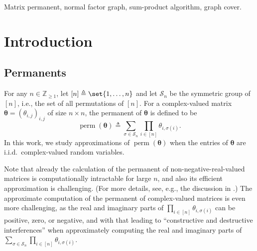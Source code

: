 \documentclass[conference]{IEEEtran}
\theoremstyle{plain}
\theoremstyle{definition}
\providecommand{\Z}{\mathbb {Z}}
\newcommand{\perm}{\operatorname{perm}}
\newcommand{\btheta}{\boldsymbol{\theta}}
\newcommand{\defeq}{\triangleq}
\begin{document}

\begin{IEEEkeywords}
 Matrix permanent, normal factor graph, sum-product algorithm, graph cover.
\end{IEEEkeywords}


\section{Introduction}



\subsection{Permanents}


For any $n\in\Z_{\geq1}$, let $[n] \defeq \set{1, \dots, n}$ and let
$\mathcal{S}_n$ be the symmetric group of $[n]$, i.e., the set of all
permutations of $[n]$. For a complex-valued matrix
$\btheta=(\theta_{i,j})_{i,j}$ of size $n \times n$, the permanent of $\btheta$
is defined to be
\[\perm(\btheta) \defeq \sum_{\sigma\in \mathcal{S}_n}\prod_{i\in[n]}
 \theta_{i,\sigma(i)}.\] In this work, we study approximations of $\perm (\btheta)$ when the entries
   of $\btheta$ are i.i.d.~complex-valued random variables.


Note that already the calculation of the permanent of non-negative-real-valued
matrices is computationally intractable for large $n$, and also its efficient
approximation is challenging. (For more details, see, e.g., the discussion in
\cite{vontobelBethePermanentNonnegative2013}.) The approximate computation of
the permanent of complex-valued matrices is even more challenging, as the real
and imaginary parts of $\prod_{i\in[n]} \theta_{i,\sigma(i)}$ can be positive,
zero, or negative, and with that leading to ``constructive and destructive
interferences'' when approximately computing the real and imaginary parts of
$\sum_{\sigma\in \mathcal{S}_n}\prod_{i\in[n]} \theta_{i,\sigma(i)}$.
\end{document}
